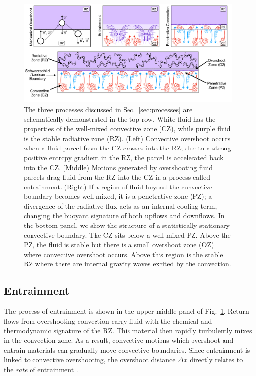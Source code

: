 \begin{figure}[t]
\centering
\includegraphics[width=\textwidth]{processes_and_structure_figure.pdf}
\caption{
    The three processes discussed in Sec.~\ref{sec:processes} are schematically demonstrated in the top row.
    White fluid has the properties of the well-mixed convective zone (CZ), while purple fluid is the stable radiative zone (RZ).
    (Left) Convective overshoot occurs when a fluid parcel from the CZ crosses into the RZ; due to a strong positive entropy gradient in the RZ, the parcel is accelerated back into the CZ.
    (Middle) Motions generated by overshooting fluid parcels drag fluid from the RZ into the CZ in a process called entrainment.
    (Right) If a region of fluid beyond the convective boundary becomes well-mixed, it is a penetrative zone (PZ); a divergence of the radiative flux acts as an internal cooling term, changing the buoyant signature of both upflows and downflows.
    In the bottom panel, we show the structure of a statistically-stationary convective boundary.
    The CZ sits below a well-mixed PZ.
    Above the PZ, the fluid is stable but there is a small overshoot zone (OZ) where convective overshoot occurs.
    Above this region is the stable RZ where there are internal gravity waves excited by the convection.
\label{fig:schema}
}
\end{figure}





\subsection{Entrainment}
The process of entrainment is shown in the upper middle panel of Fig.~\ref{fig:schema}.
Return flows from overshooting convection carry fluid with the chemical and thermodynamic signature of the RZ.
This material then rapidly turbulently mixes in the convection zone.
As a result, convective motions which overshoot and entrain materials can gradually move convective boundaries.
Since entrainment is linked to convective overshooting, the overshoot distance $\Delta x$ directly relates to the \emph{rate} of entrainment \citep[which can be inferred from frequently-plotted entrainment rate laws;][]{meakin_arnett_2007}.

